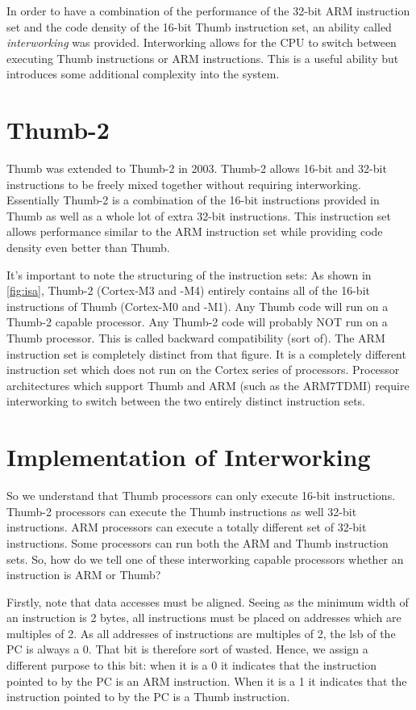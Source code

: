 In order to have a combination of the performance of the 32-bit ARM instruction set and the code density of the 16-bit Thumb instruction set, an ability called \emph{interworking} was provided. Interworking allows for the CPU to switch between executing Thumb instructions or ARM instructions. This is a useful ability but introduces some additional complexity into the system.

\section{Thumb-2}
Thumb was extended to Thumb-2 in 2003. Thumb-2 allows 16-bit and 32-bit instructions to be freely mixed together without requiring interworking. Essentially Thumb-2 is a combination of the 16-bit instructions provided in Thumb as well as a whole lot of extra 32-bit instructions. This instruction set allows performance similar to the ARM instruction set while providing code density even better than Thumb. 

It's important to note the structuring of the instruction sets: As shown in \autoref{fig:isa}, Thumb-2 (Cortex-M3 and -M4) entirely contains all of the 16-bit instructions of Thumb (Cortex-M0 and -M1). Any Thumb code will run on a Thumb-2 capable processor. Any Thumb-2 code will probably NOT run on a Thumb processor. This is called backward compatibility (sort of). The ARM instruction set is completely distinct from that figure. It is a completely different instruction set which does not run on the Cortex series of processors. Processor architectures which support Thumb and ARM (such as the ARM7TDMI) require interworking to switch between the two entirely distinct instruction sets.

\section{Implementation of Interworking}
So we understand that Thumb processors can only execute 16-bit instructions. Thumb-2 processors can execute the Thumb instructions as well 32-bit instructions. ARM processors can execute a totally different set of 32-bit instructions. Some processors can run both the ARM and Thumb instruction sets. So, how do we tell one of these interworking capable processors whether an instruction is ARM or Thumb?

Firstly, note that data accesses must be aligned. Seeing as the minimum width of an instruction is 2 bytes, all instructions must be placed on  addresses which are multiples of 2. As all addresses of instructions are multiples of 2, the lsb of the PC is always a 0. That bit is therefore sort of wasted. Hence, we assign a different purpose to this bit: when it is a 0 it indicates that the instruction pointed to by the PC is an ARM instruction. When it is a 1 it indicates that the instruction pointed to by the PC is a Thumb instruction. 

